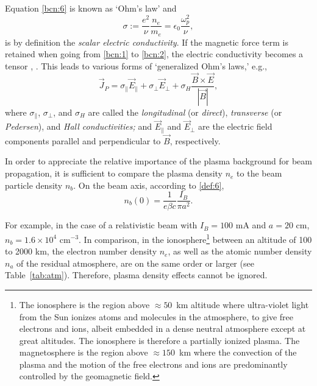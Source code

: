 \documentclass [12pt,a4paper,     ]{report} %
\newcommand{\DEF}{:=}                 %
\begin{document}
 Equation \eqref{bcn:6} is known as `Ohm's law' and
%
\begin{equation}\label{bcn:7} %
      \sigma \DEF  \frac{e^2}{\nu} \frac{n_e}{m_e}
             = \epsilon_0 \frac{\omega_p^2}{\nu},
\end{equation}
%
is by definition the \emph{scalar electric conductivity}.  If the magnetic force term is retained when going from \eqref{bcn:1} to \eqref{bcn:2}, the electric conductivity becomes a tensor \cite{SPITZ1956-}, \cite[p.500]{JACKS1975-}. This leads to various forms of `generalized Ohm's laws,' e.g.,
%
\begin{equation}\label{bcn:8} %
   \vec{J}_P = \sigma_{\|} \vec{E}_{\|}
             + \sigma_{\perp} \vec{E}_{\perp}
             + \sigma_{H} \frac{\vec{B}\times \vec{E}}{|\vec{B}|},
\end{equation}
%
where $\sigma_{\|}$, $\sigma_{\perp}$, and $\sigma_{H}$ are called the \emph{longitudinal} (or \emph{direct}), \emph{transverse} (or \emph{Pedersen}), and \emph{Hall conductivities;} and $\vec{E}_{\|}$ and $\vec{E}_{\perp}$ are the electric field components parallel and perpendicular to $\vec{B}$, respectively.

	In order to appreciate the relative importance of the plasma background for beam propagation, it is sufficient to compare the plasma density $n_e$ to the beam particle density $n_b$.  On the beam axis, according to \eqref{def:6},
%
\begin{equation}\label{bcn:9} %
    n_b(0) = \frac{1}{e\beta c} \frac{I_B}{\pi a^2}.
\end{equation}
%

	For example, in the case of a relativistic beam with $I_B= 100$ mA and $a = 20$ cm, $n_b = 1.6 \times 10^4$ cm$^{-3}$.  In comparison, in the ionosphere\footnote{The ionosphere is the region above $\approx 50$~km altitude where ultra-violet light from the Sun ionizes atoms and molecules in the atmosphere, to give free electrons and ions, albeit embedded in a dense neutral atmosphere except at great altitudes. The ionosphere is therefore a partially ionized plasma.   The magnetosphere is the region above $\approx 150$~km where the convection of the plasma and the motion of the free electrons and ions are predominantly controlled by the geomagnetic field.} between an altitude of 100 to 2000 km, the electron number density $n_e$, as well as the atomic number density $n_a$ of the residual atmosphere, are on the same order or larger (see Table~\ref{tab:atm}).  Therefore, plasma density effects cannot be ignored.
\end{document}

